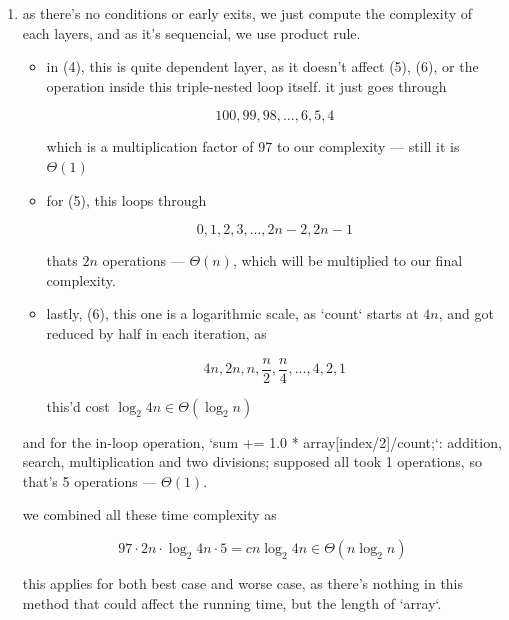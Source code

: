 \documentclass{article}
\theoremstyle{remark}
\begin{document}
\begin{enumerate}
    \medskip
    \begin{center}
    \rule{0.3\linewidth}{0.2pt}
    \end{center}
    \medskip

    \item as there's no conditions or early exits, we just compute the complexity of each layers, and as it's sequencial, we use product rule.

        \begin{itemize}
            \item in (4), this is quite dependent layer, as it doesn't affect (5), (6), or the operation inside this triple-nested loop itself. it just goes through 

                \[100, 99, 98, ..., 6, 5, 4\]

                which is a multiplication factor of 97 to our complexity --- still it is $\Theta(1)$
            
            \item for (5), this loops through

                \[0, 1, 2, 3, ..., 2n-2, 2n-1\]

                thats $2n$ operations --- $\Theta(n)$, which will be multiplied to our final complexity.

            \item lastly, (6), this one is a logarithmic scale, as `count` starts at $4n$, and got reduced by half in each iteration, as

                \[4n, 2n, n, \frac{n}{2}, \frac{n}{4}, ..., 4, 2, 1\]

                this'd cost $\log_2 4n \in \Theta(\log_2 n)$
        \end{itemize}

        and for the in-loop operation, `sum += 1.0 * array[index/2]/count;`: addition, search, multiplication and two divisions; supposed all took 1 operations, so that's 5 operations --- $\Theta(1)$.

        \vspace{1em}

        we combined all these time complexity as 

        \[97 \cdot 2n \cdot \log_2 4n \cdot 5 = cn{\log_2 4n} \in \boxed{\Theta(n\log_2 n)}\]

        this applies for both best case and worse case, as there's nothing in this method that could affect the running time, but the length of `array`.
\end{enumerate}
\end{document}
